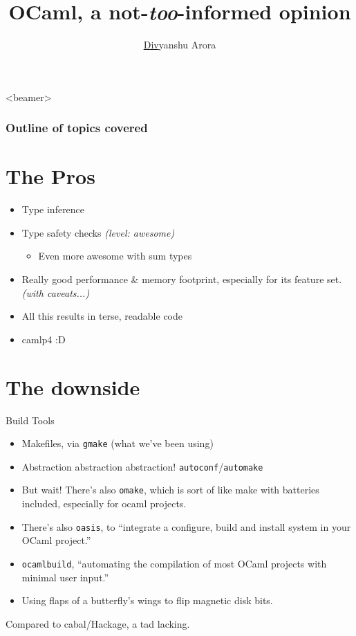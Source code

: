 \documentclass{beamer}
\title[OCaml, a not-\textit{too}-informed opinion]{
OCaml, a not-\textit{too}-informed opinion
}%
\author[Arora]{\underline{Div}yanshu Arora}
\institute[NUS]{
  \texttt{arora@comp.nus.edu.sg}
}
\begin{document}
\begin{frame}[plain]
  \titlepage
\end{frame}

\begin{frame}<beamer>
  \frametitle{Outline of topics covered}
  \tableofcontents
\end{frame}

\section{The Pros}
\label{sec:pro}

\begin{frame}{}
  \begin{itemize}
  \item Type inference
    \pause
  \item Type safety checks \textit{(level: awesome)}
    \pause
    \begin{itemize}
    \item Even more awesome with sum types
    \end{itemize}
    \pause
  \item Really good performance \& memory footprint, especially for
    its feature set. \textit{(with caveats...)}
    \pause
  \item All this results in terse, readable code
    \pause
  \item camlp4 :D
  \end{itemize}
\end{frame}

\section{The downside}
\label{sec:downside}

\begin{frame}{Build Tools}
  \begin{itemize}
  \item Makefiles, via \texttt{gmake} (what we've been using)
  \item Abstraction abstraction abstraction! \texttt{autoconf}/\texttt{automake}
    \pause
  \item But wait! There's also \texttt{omake}, which is sort of like make with
    batteries included, especially for ocaml projects.
    \pause
  \item There's also \texttt{oasis}, to ``integrate a configure, build and
    install system in your OCaml project.''
    \pause
  \item \texttt{ocamlbuild}, ``automating the compilation of most OCaml
    projects with minimal user input.''
    \pause
  \item Using flaps of a butterfly's wings to flip magnetic disk bits.
    \pause
  \end{itemize}
  Compared to cabal/Hackage, a tad lacking.
\end{frame}
\end{document}
